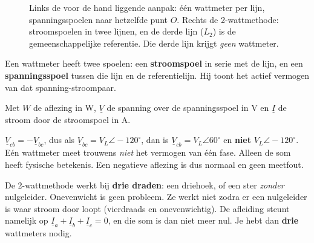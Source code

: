 \documentclass[a4paper,11pt]{article}
\begin{document}
\begin{figure}[H]
    \caption{Links de voor de hand liggende aanpak: \'e\'en wattmeter per lijn, spanningsspoelen naar
        hetzelfde punt $O$. Rechts de 2-wattmethode: stroomspoelen in twee lijnen, en de derde lijn
        ($L_2$) is de gemeenschappelijke referentie. Die derde lijn krijgt \emph{geen} wattmeter.}
    \label{fig:wattmeters-2-vs-3}
\end{figure}
\FloatBarrier

Een wattmeter heeft twee spoelen: een \textbf{stroomspoel} in serie met de lijn, en een
\textbf{spanningsspoel} tussen die lijn en de referentielijn. Hij toont het actief vermogen van dat
spanning-stroompaar.

{Met $W$ de aflezing in W, $\underline{V}$ de spanning over de spanningsspoel in V en
    $\underline{I}$ de stroom door de stroomspoel in A.}

\begin{waarschuwing}
    $\underline{V}_{cb} = -\underline{V}_{bc}$, dus als $\underline{V}_{bc} = V_L\angle -120^\circ$,
    dan is $\underline{V}_{cb} = V_L\angle 60^\circ$ en \textbf{niet} $V_L\angle -120^\circ$.
    Eén wattmeter meet trouwens \emph{niet} het vermogen van \'e\'en fase. Alleen de som heeft
    fysische betekenis. Een negatieve aflezing is dus normaal en geen meetfout.
\end{waarschuwing}

De 2-wattmethode werkt bij \textbf{drie draden}: een driehoek, of een ster \emph{zonder}
nulgeleider. Onevenwicht is geen probleem. Ze werkt niet zodra er een nulgeleider is waar stroom
door loopt (vierdraads en onevenwichtig). De afleiding steunt namelijk op $\underline{I}_a +
    \underline{I}_b + \underline{I}_c = 0$, en die som is dan niet meer nul. Je hebt dan
\textbf{drie} wattmeters nodig.
\end{document}
